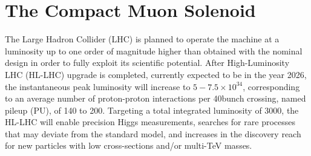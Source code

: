 \section{The Compact Muon Solenoid}\label{sec:cms}

The Large Hadron Collider (LHC) \cite{LHCMachine} is planned to operate the machine at a luminosity up to one order of magnitude higher than obtained with the nominal design in order to fully exploit its scientific potential.  After High-Luminosity LHC (HL-LHC) upgrade \cite{hl-lhc-prelim-design-report} is completed, currently expected to be in the year 2026, the instantaneous peak luminosity will increase to $5-7.5 \times {10}^{34}$\percms, corresponding to an average number of proton-proton interactions per 40\MHz bunch crossing, named pileup (PU), of 140 to 200. Targeting a total integrated luminosity of $3000$\fbinv, the HL-LHC will enable precision Higgs measurements, searches for rare processes that may deviate from the standard model, and increases in the discovery reach for new particles with low cross-sections and/or multi-TeV masses.
